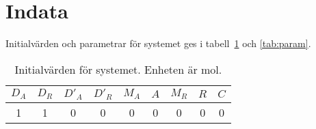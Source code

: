 \section{Indata}
\label{sec:indata}

Initialvärden och parametrar för systemet ges i tabell~\ref{tab:initial} och
\ref{tab:param}.

\begin{table}
	\centering
	\begin{tabular}{ccccccccc}
	  \toprule
		$D_A$ & $D_R$ & $D'_A$ & $D'_R$ & $M_A$ & $A$ & $M_R$ & $R$ &
		$C$ \\
		\midrule
		1 & 1 & 0 & 0 & 0 & 0 & 0 & 0 & 0\\
		\bottomrule
	\end{tabular}
	\label{tab:initial}
	\caption{Initialvärden för systemet. Enheten är mol.}
\end{table}

\begin{table}
	\centering
	\label{tab:param}
	\caption{Parametrar för systemet. Alla parametrar har enheterna
	  h$^{-1}$ förutom $\gamma$ som har enheten mol$^{-1}$h$^{-1}$.}
\end{table}
